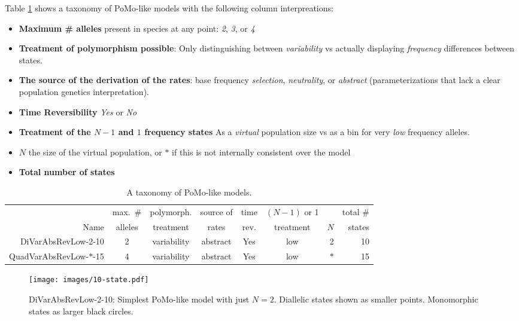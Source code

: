 \documentclass{llncs}
\newcommand{\virtPopSize}{\ensuremath{N}}
\newcommand{\pomo}{PoMo\xspace}
\begin{document}
Table \ref{taxonomy} shows a taxonomy of \pomo-like models with the following column interpreations:
\begin{itemize}
    \item \textbf{Maximum \# alleles} present in species at any point: {\em 2}, {\em 3}, or {\em 4}
    \item \textbf{Treatment of polymorphism possible}: Only distinguishing between {\em variability} vs
    actually displaying {\em frequency} differences between states.
    \item \textbf{The source of the derivation of the rates}: base frequency {\em selection}, {\em neutrality}, or {\em abstract} (parameterizations that lack a clear population genetics interpretation).
    \item \textbf{Time Reversibility} {\em Yes} or {\em No}
    \item \textbf{Treatment of the $\virtPopSize -1$ and $1$ frequency states} As a {\em virtual} population size vs as a bin for very {\em low} frequency alleles.
    \item \textbf{$\virtPopSize$} the size of the virtual population, or $\ast$ if this is not internally consistent over the model
    \item \textbf{Total number of states}
\end{itemize}
\begin{table}
    \caption{A taxonomy of \pomo-like models.}\label{taxonomy}
        \begin{tabular}{r|c|c|c|c|c|r|r}
                           & max.~\# & polymorph.& source of & time & $(\virtPopSize -1)$ or 1  & & total \#\\
        Name               & alleles & treatment & rates     & rev. & treatment                 & $\virtPopSize $& states\\
        \hline
        DiVarAbsRevLow-2-10   & 2 & variability &abstract & Yes   & low & 2 & 10\\
        \hline
        QuadVarAbsRevLow-$\ast$-15 & 4 & variability &abstract & Yes   & low & $\ast$ & 15\\
        \hline
        \end{tabular}
    \begin{center}
    \end{center}
\end{table}

\begin{figure}
    \begin{center}
        \texttt{[image: images/10-state.pdf]}
        \caption{DiVarAbsRevLow-2-10: Simplest \pomo-like model with just $\virtPopSize=2$. Diallelic states shown as smaller points. Monomorphic states as larger black circles.}\label{pomoDiVarAbsRevLow}
    \end{center}
\end{figure}
\end{document}
